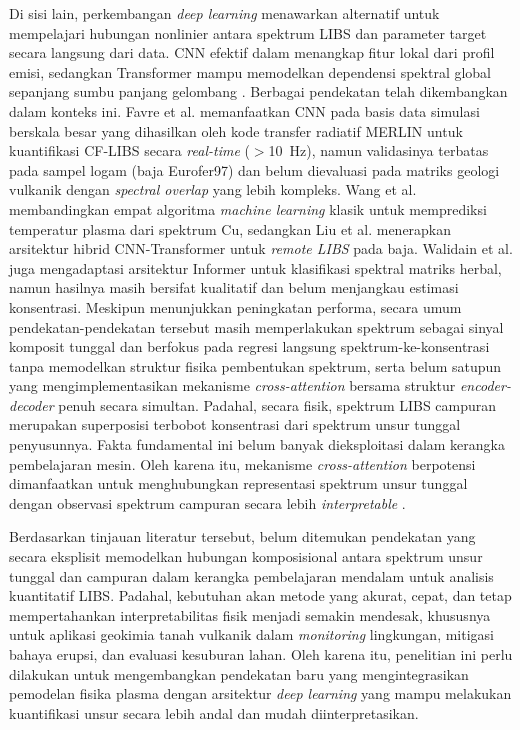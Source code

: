 Di sisi lain, perkembangan \textit{deep learning} menawarkan alternatif untuk mempelajari hubungan nonlinier antara spektrum LIBS dan parameter target secara langsung dari data. CNN efektif dalam menangkap fitur lokal dari profil emisi, sedangkan Transformer mampu memodelkan dependensi spektral global sepanjang sumbu panjang gelombang \citep{liu_remote_2026}. Berbagai pendekatan telah dikembangkan dalam konteks ini. Favre et al. \citep{favre_towards_2025} memanfaatkan CNN pada basis data simulasi berskala besar yang dihasilkan oleh kode transfer radiatif MERLIN untuk kuantifikasi CF-LIBS secara \textit{real-time} ($>$10~Hz), namun validasinya terbatas pada sampel logam (baja Eurofer97) dan belum dievaluasi pada matriks geologi vulkanik dengan \textit{spectral overlap} yang lebih kompleks. Wang et al. \citep{wang_simulation_2024} membandingkan empat algoritma \textit{machine learning} klasik untuk memprediksi temperatur plasma dari spektrum Cu, sedangkan Liu et al. \citep{liu_remote_2026} menerapkan arsitektur hibrid CNN-Transformer untuk \textit{remote LIBS} pada baja. Walidain et al. \citep{walidain_informer-based_2026} juga mengadaptasi arsitektur Informer untuk klasifikasi spektral matriks herbal, namun hasilnya masih bersifat kualitatif dan belum menjangkau estimasi konsentrasi. Meskipun menunjukkan peningkatan performa, secara umum pendekatan-pendekatan tersebut masih memperlakukan spektrum sebagai sinyal komposit tunggal dan berfokus pada regresi langsung spektrum-ke-konsentrasi tanpa memodelkan struktur fisika pembentukan spektrum, serta belum satupun yang mengimplementasikan mekanisme \textit{cross-attention} bersama struktur \textit{encoder-decoder} penuh secara simultan. Padahal, secara fisik, spektrum LIBS campuran merupakan superposisi terbobot konsentrasi dari spektrum unsur tunggal penyusunnya. Fakta fundamental ini belum banyak dieksploitasi dalam kerangka pembelajaran mesin. Oleh karena itu, mekanisme \textit{cross-attention} berpotensi dimanfaatkan untuk menghubungkan representasi spektrum unsur tunggal dengan observasi spektrum campuran secara lebih \textit{interpretable} \citep{vaswani_attention_2017}.

Berdasarkan tinjauan literatur tersebut, belum ditemukan pendekatan yang secara eksplisit memodelkan hubungan komposisional antara spektrum unsur tunggal dan campuran dalam kerangka pembelajaran mendalam untuk analisis kuantitatif LIBS. Padahal, kebutuhan akan metode yang akurat, cepat, dan tetap mempertahankan interpretabilitas fisik menjadi semakin mendesak, khususnya untuk aplikasi geokimia tanah vulkanik dalam \textit{monitoring} lingkungan, mitigasi bahaya erupsi, dan evaluasi kesuburan lahan. Oleh karena itu, penelitian ini perlu dilakukan untuk mengembangkan pendekatan baru yang mengintegrasikan pemodelan fisika plasma dengan arsitektur \textit{deep learning} yang mampu melakukan kuantifikasi unsur secara lebih andal dan mudah diinterpretasikan.

